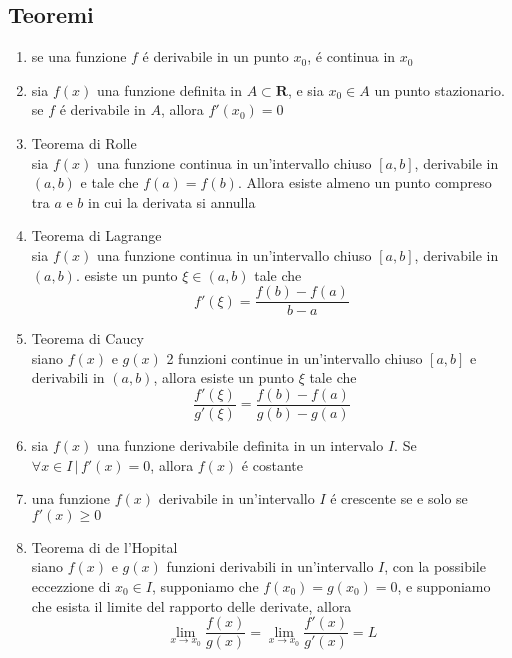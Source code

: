 \documentclass{exam}
\begin{document}
  \subsection{Teoremi}
    \begin{enumerate}
      \item
        se una funzione $f$ \'e derivabile in un punto $x_{0}$, \'e continua in $x_{0}$
      \item 
        sia $f(x)$ una funzione definita in $A\subset \mathbf{R}$, e sia $x_{0}\in A$ un punto stazionario. se $f$ \'e derivabile in $A$, allora $f'(x_{0})=0$
      \item{Teorema di Rolle}\\
        sia $f(x)$ una funzione continua in un'intervallo chiuso $[a,b]$, derivabile in $(a,b)$ e tale che $f(a)=f(b)$. Allora esiste almeno un punto compreso tra $a$ e $b$ in cui la derivata si annulla
      \item{Teorema di Lagrange}\\
        sia $f(x)$ una funzione continua in un'intervallo chiuso $[a,b]$, derivabile in $(a,b)$. esiste un punto $\xi \in (a,b)$ tale che
        \begin{equation}
          f'(\xi)=\frac{f(b)-f(a)}{b-a}
        \end{equation}
      \item{Teorema di Caucy}\\
        siano $f(x)$ e $g(x)$ 2 funzioni continue in un'intervallo chiuso $[a,b]$ e derivabili in $(a,b)$, allora esiste un punto $\xi$ tale che
        \begin{equation}
          \frac{f'(\xi)}{g'(\xi)}=\frac{f(b)-f(a)}{g(b)-g(a)}
        \end{equation}
      \item
        sia $f(x)$ una funzione derivabile definita in un intervalo $I$. Se $\forall x\in I\,|\,f'(x)=0$, allora $f(x)$ \'e costante
      \item
        una funzione $f(x)$ derivabile in un'intervallo $I$ \'e crescente se e solo se $f'(x)\ge 0$
      \item{Teorema di de l'Hopital}\\
        siano $f(x)$ e $g(x)$ funzioni derivabili in un'intervallo $I$, con la possibile eccezzione di $x_{0}\in I$, supponiamo che $f(x_{0})=g(x_{0})=0$, e supponiamo che esista il limite del rapporto delle derivate, allora
        \begin{equation}
          \lim_{x\to x_{0}}\frac{f(x)}{g(x)}=\lim_{x\to x_{0}}\frac{f'(x)}{g'(x)}=L
        \end{equation}
    \end{enumerate}
\end{document}
